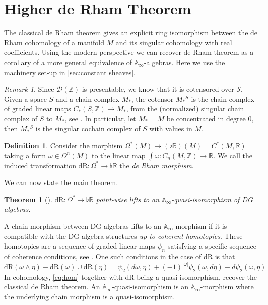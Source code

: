 \documentclass[10pt]{amsart}
\newcommand{\bA}{\mathbb{A}}
\newcommand{\D}{\mathscr{D}}
\newcommand{\s}{\mathscr{S}}
\newcommand{\bR}{\mathbb{R}}
\newcommand{\bZ}{\mathbb{Z}}
\newcommand{\dr}{\mathrm{dR}}
\newtheorem{theorem}[equation]{Theorem}
\theoremstyle{definition}
\newtheorem{definition}[equation]{Definition}
\theoremstyle{remark}
\newtheorem{remark}[equation]{Remark}
\numberwithin{equation}{section}
\begin{document}
\section{Higher de Rham Theorem}
The classical de Rham theorem gives an explicit ring isomorphism between the de Rham cohomology of a manifold $M$ and its singular cohomology with real coefficients. Using the modern perspective we can recover de Rham theorem as a corollary of a more general equivalence of $\bA_\infty$-algebras. Here we use the machinery set-up in \cref{sec:constant sheaves}.
\begin{remark}\label{rmk:Dcotensor}
  Since $\D(\bZ)$ is presentable, we know that it is cotensored over $\s$. Given a space $S$ and a chain complex $M_*$, the cotensor $M_*{}^S$ is the chain complex of graded linear maps $C_*(S,\bZ)\to M_*$, from the (normalized) singular chain complex of $S$ to $M_*$, see \cite[Definition 1.3.2.1]{lurie2017ha}. In particular, let $M_*=M$ be concentrated in degree 0, then $M_*{}^S$ is the singular cochain complex of $S$ with values in $M$. 
\end{remark}
\begin{definition}\label{def:derhammorf}
Consider the morphism $\Omega^*(M)\to (\flat\bR)(M)=C^*(M,\bR)$ taking a form $\omega\in\Omega^n(M)$ to the linear map $\int\omega:C_{n}(M,\bZ)\to\bR$. We call the induced transformation $\dr:\Omega^*\to\flat\bR$ the \emph{de Rham morphism}.  
\end{definition}

We can now state the main theorem. 

\begin{theorem}[{\cite[Theorem 3.25]{abad2010ainftyrhamtheoremintegration}}]\label{thm:derham} 
  $\dr:\Omega^*\to\flat\bR$ point-wise lifts to an $\bA_\infty$-quasi-isomorphism of DG algebras.
\end{theorem}
A chain morphism between DG algebras lifts to an $\bA_\infty$-morphism if it is compatible with the DG algebra structures \emph{up to coherent homotopies}. These homotopies are a sequence of graded linear maps $\psi_n$ satisfying a specific sequence of coherence conditions, see \cite[Proposition 10.2.12]{loday2012algebraic}. One such conditions in the case of $\dr$ is that 
\begin{equation}\label{eq:hom}
  \dr(\omega\wedge\eta)-\dr(\omega)\cup\dr(\eta)=\psi_2(d\omega,\eta)+(-1)^{|\omega|}\psi_2(\omega,d\eta)-d\psi_2(\omega,\eta)
\end{equation}
In cohomology, \cref{eq:hom} together with $\dr$ being a quasi-isomorphism, recover the classical de Rham theorem. An $\bA_\infty$-quasi-isomorphism is an $\bA_\infty$-morphism where the underlying chain morphism is a quasi-isomorphism. 
\end{document}
